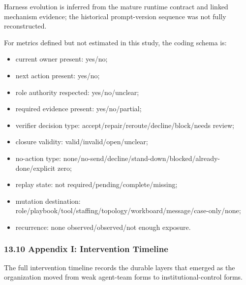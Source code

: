 \documentclass[
]{article}
\newcounter{none} %
\providecommand{\tightlist}{%
  \setlength{\itemsep}{0pt}\setlength{\parskip}{0pt}}
\begin{document}
Harness evolution is inferred from the mature runtime contract and linked mechanism evidence; the historical prompt-version sequence was not fully reconstructed.

For metrics defined but not estimated in this study, the coding schema is:

\begin{itemize}
\tightlist
\item
  current owner present: yes/no;
\item
  next action present: yes/no;
\item
  role authority respected: yes/no/unclear;
\item
  required evidence present: yes/no/partial;
\item
  verifier decision type: accept/repair/reroute/decline/block/needs review;
\item
  closure validity: valid/invalid/open/unclear;
\item
  no-action type: none/no-send/decline/stand-down/blocked/already-done/explicit zero;
\item
  replay state: not required/pending/complete/missing;
\item
  mutation destination: role/playbook/tool/staffing/topology/workboard/message/case-only/none;
\item
  recurrence: none observed/observed/not enough exposure.
\end{itemize}

\subsubsection{13.10 Appendix I: Intervention Timeline}\label{appendix-i-intervention-timeline}

The full intervention timeline records the durable layers that emerged as the organization moved from weak agent-team forms to institutional-control forms.
\end{document}
